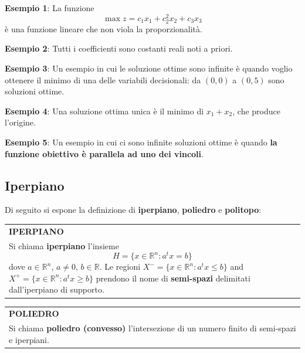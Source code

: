 \documentclass[a4paper]{extarticle}
\renewcommand\arraystretch{}
\begin{document}
\vspace{1em}
\noindent
\textbf{Esempio 1}: La funzione
\[\max z = c_1 x_1 + c_2^2 x_2 + c_3 x_3\]
è una funzione lineare che non viola la proporzionalità.

\vspace{1em}
\noindent
\textbf{Esempio 2}: Tutti i coefficienti sono costanti reali noti a priori.

\vspace{1em}
\noindent
\textbf{Esempio 3}: Un esempio in cui le soluzione ottime sono infinite è quando voglio ottenere il minimo di una delle variabili decisionali: da $(0,0)$ a $(0,5)$ sono soluzioni ottime.

\vspace{1em}
\noindent
\textbf{Esempio 4}: Una soluzione ottima unica è il minimo di $x_1+x_2$, che produce l'origine.


\vspace{1em}
\noindent
\textbf{Esempio 5}: Un esempio in cui ci sono infinite soluzioni ottime è quando \textbf{la funzione obiettivo è parallela ad uno dei vincoli}.

\vspace{1em}
\subsection{Iperpiano}
Di seguito si espone la definizione di \textbf{iperpiano}, \textbf{poliedro} e \textbf{politopo}:

\vspace{1em}
\setlength{\tabcolsep}{14pt}
\renewcommand{\arraystretch}{2}
\noindent
\begin{tabularx}{\textwidth}{@{}|P|@{}}
    \hline
    {\textbf{IPERPIANO}}\\
    \parbox{\linewidth}{Si chiama \textbf{iperpiano} l'insieme
    \[H = \{x \in \mathbb{R}^n : a{^t}x=b\}\]
    dove $a \in \mathbb{R}^n$, $a \neq 0$, $b \in \mathbb{R}$.\\
    Le regioni $X^-=\{x \in \mathbb{R}^n : a{^t}x \leq b\}$ and $X^+ = \{x \in \mathbb{R}^n : a{^t}x \geq b \}$ prendono il nome di \textbf{semi-spazi} delimitati dall'iperpiano di supporto. \vspace{3mm}}\\
    \hline
\end{tabularx}

\vspace{2em}
\setlength{\tabcolsep}{14pt}
\renewcommand{\arraystretch}{2}
\noindent
\begin{tabularx}{\textwidth}{@{}|P|@{}}
    \hline
    {\textbf{POLIEDRO}}\\
    \parbox{\linewidth}{Si chiama \textbf{poliedro (convesso)} l'intersezione di un numero finito di semi-spazi e iperpiani.\vspace{1mm}}\\
    \hline
\end{tabularx}
\end{document}
